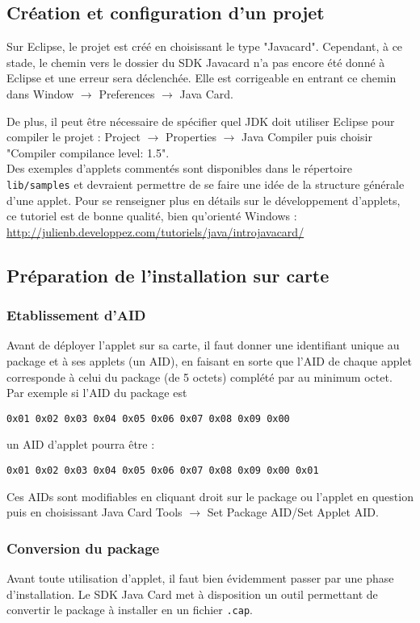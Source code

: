\documentclass[a4paper,11pt,french]{article}
\begin{document}
\subsection{Création et configuration d'un projet}
Sur Eclipse, le projet est créé en choisissant le type "Javacard". Cependant,
à ce stade, le chemin vers le dossier du SDK Javacard n'a pas encore été donné
à Eclipse et une erreur sera déclenchée. Elle est corrigeable en entrant ce chemin
dans Window $\rightarrow$ Preferences $\rightarrow$ Java Card.

De plus, il peut être nécessaire de spécifier quel JDK doit utiliser Eclipse
pour compiler le projet : Project $\rightarrow$ Properties $\rightarrow$ Java 
Compiler puis choisir "Compiler compilance level: 1.5".\\

Des exemples d'applets commentés sont disponibles dans le répertoire \texttt{lib/samples}
et devraient permettre de se faire une idée de la structure générale d'une 
applet. Pour se renseigner plus en détails sur le développement d'applets, 
ce tutoriel est de bonne qualité, bien qu'orienté Windows : 
\url{http://julienb.developpez.com/tutoriels/java/introjavacard/}

\subsection{Préparation de l'installation sur carte}
\subsubsection{Etablissement d'AID}
Avant de déployer l'applet sur sa carte, il faut donner une identifiant unique
au package et à ses applets (un AID), en faisant en sorte que l'AID de chaque applet
corresponde à celui du package (de 5 octets) complété par au minimum octet. 
Par exemple si l'AID du package est 
\begin{verbatim}
0x01 0x02 0x03 0x04 0x05 0x06 0x07 0x08 0x09 0x00
\end{verbatim}
un AID d'applet pourra être :
\begin{verbatim}
0x01 0x02 0x03 0x04 0x05 0x06 0x07 0x08 0x09 0x00 0x01
\end{verbatim}
Ces AIDs sont modifiables en cliquant droit sur le package ou l'applet en question
puis en choisissant Java Card Tools $\rightarrow$ Set Package AID/Set Applet AID. \\

\subsubsection{Conversion du package}
Avant toute utilisation d'applet, il faut bien évidemment passer par une phase
d'installation. Le SDK Java Card met à disposition un outil permettant de convertir
le package à installer en un fichier \texttt{.cap}.
\end{document}
